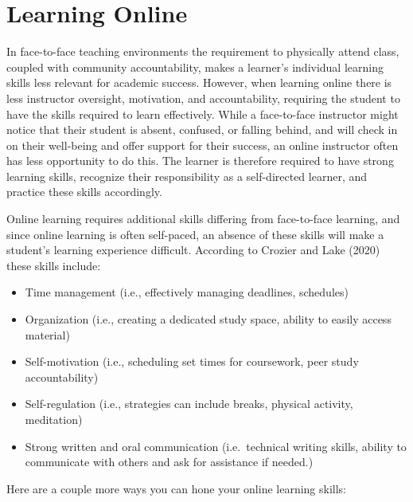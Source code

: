 \documentclass[
  letterpaper,
  DIV=11,
  numbers=noendperiod]{scrreprt}
\providecommand{\tightlist}{%
  \setlength{\itemsep}{0pt}\setlength{\parskip}{0pt}}\usepackage{longtable,booktabs,array}
\begin{document}
\section{Learning Online}\label{learning-online}

In face-to-face teaching environments the requirement to physically
attend class, coupled with community accountability, makes a learner's
individual learning skills less relevant for academic success. However,
when learning online there is less instructor oversight, motivation, and
accountability, requiring the student to have the skills required to
learn effectively. While a face-to-face instructor might notice that
their student is absent, confused, or falling behind, and will check in
on their well-being and offer support for their success, an online
instructor often has less opportunity to do this. The learner is
therefore required to have strong learning skills, recognize their
responsibility as a self-directed learner, and practice these skills
accordingly.

Online learning requires additional skills differing from face-to-face
learning, and since online learning is often self-paced, an absence of
these skills will make a student's learning experience difficult.
According to Crozier and Lake (2020) these skills include:

\begin{itemize}
\tightlist
\item
  Time management (i.e., effectively managing deadlines, schedules)
\item
  Organization (i.e., creating a dedicated study space, ability to
  easily access material)
\item
  Self-motivation (i.e., scheduling set times for coursework, peer study
  accountability)
\item
  Self-regulation (i.e., strategies can include breaks, physical
  activity, meditation)
\item
  Strong written and oral communication (i.e.~technical writing skills,
  ability to communicate with others and ask for assistance if needed.)
\end{itemize}

Here are a couple more ways you can hone your online learning skills:
\end{document}
